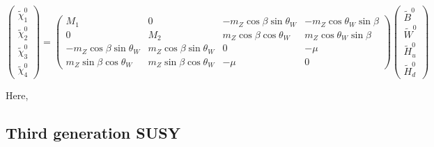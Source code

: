 			\begin{equation}
			\label{eq:neutralino_mixing}
					\begin{pmatrix}  \tilde{\chi}^{0}_1 \\ \tilde{\chi}^{0}_2 \\ \tilde{\chi}^{0}_3 \\ \tilde{\chi}^{0}_4 \end{pmatrix}	
					= 
					\begin{pmatrix}
						M_1 & 0 & - m_Z \cos \beta \sin \theta_W & - m_Z \cos \theta_W \sin \beta \\
						0 & M_2 & m_Z \cos \beta \cos \theta_W &  m_Z \cos \theta_W \sin \beta \\
						- m_Z \cos \beta \sin \theta_W & m_Z \cos \beta \sin \theta_W & 0 & - \mu \\ 
						m_Z \sin \beta \cos \theta_W & m_Z \sin \beta \cos \theta_W & - \mu & 0  
					\end{pmatrix}
					\begin{pmatrix}
						\tilde{B}^{0} \\
						\tilde{W}^{0} \\
						\tilde{H}^{0}_u \\
						\tilde{H}^{0}_d
					\end{pmatrix}
			\end{equation}

			\noindent Here, 

		\subsection{Third generation SUSY}